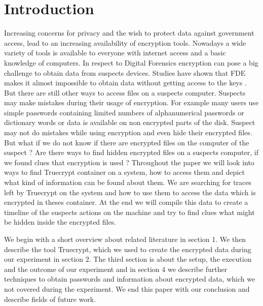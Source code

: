 \section{Introduction}
Increasing concerns for privacy and the wish to protect data against government access, lead to an increasing availability of encryption tools. Nowadays a wide variety of tools is available to everyone with internet access and a basic knowledge of computers.
In respect to Digital Forensics encryption can pose a big challenge to obtain data from suspects devices. Studies have shown that \gls{FDE} makes it almost impossible to obtain data without getting access to the keys \cite{casey:11}. But there are still other ways to access files on a suspects computer. Suspects may make mistakes during their usage of encryption. For example many users use simple passwords containing limited numbers of alphanumerical passwords or dictionary words \cite{worstpractise} or data is available on non encrypted parts of the disk. Suspect may not do mistakes while using encryption and even hide their encrypted files.
But what if we do not know if there are encrypted files on the computer of the suspect ? Are there ways to find hidden encrypted files on a suspects computer, if we found clues that encryption is used ? Throughout the paper we will look into ways to find Truecrypt container on a system, how to access them and depict what kind of information can be found about them. We are searching for traces left by Truecrypt on the system and how to use them to access the data which is encrypted in theses container.
At the end we will compile this data to create a timeline of the suspects actions on the machine and try to find clues what might be hidden inside the encrypted files. 

We begin with a short overview about related literature in section 1. We then describe the tool Truecrypt, which we used to create the encrypted data during our experiment in section 2. The third section is about the setup, the execution and the outcome of our experiment and in section 4 we describe further techniques to obtain passwords and information about encrypted data, which we not covered during the experiment. We end this paper with our conclusion and describe fields of future work.
